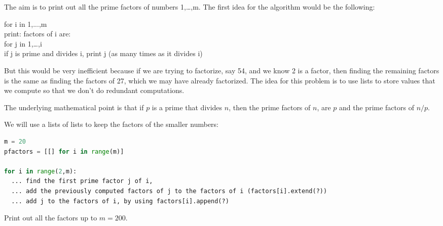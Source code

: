 \documentclass[letterpaper,11pt]{amsart}
\theoremstyle{plain}
\theoremstyle{definition}
\begin{document}
The aim is to print out all the prime factors of numbers 1,\dots,m. The first idea for the algorithm would be the following:
\begin{addmargin}{0.5in}
for i in 1,...,m\\
\indent print: factors of i are:\\
\indent for j in 1,\dots,i\\
\indent\indent if j is prime and divides i, print j (as many times as it divides i)\\
\end{addmargin}
But this would be very inefficient because if we are trying to factorize, say 54, and we know 2 is a factor, then finding the remaining factors is the same as finding the factors of 27, which we may have already factorized.  
The idea for this problem is to use lists to store values that we compute so that we don't do redundant computations.

The underlying mathematical point is that if $p$ is a prime that divides $n$, then the prime factors of $n$, are $p$ and the prime factors of $n/p$. 

We will use a lists of lists to keep the factors of the smaller numbers:
\begin{lstlisting}[language=Python]
m = 20
pfactors = [[] for i in range(m)]

for i in range(2,m):
  ... find the first prime factor j of i, 
  ... add the previously computed factors of j to the factors of i (factors[i].extend(?))  
  ... add j to the factors of i, by using factors[i].append(?)
\end{lstlisting}

Print out all the factors up to $m = 200$.
\end{document}
